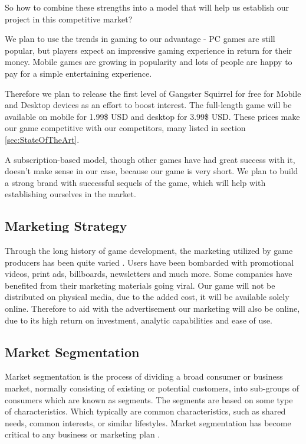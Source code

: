 \documentclass[12p]{article}
\begin{document}
So how to combine these strengths into a model that will help us establish our project in this competitive market?

We plan to use the trends in gaming to our advantage - PC games are still popular, but players expect an impressive gaming experience in return for their money. Mobile games are growing in popularity and lots of people are happy to pay for a simple entertaining experience.

Therefore we plan to release the first level of Gangster Squirrel for free for Mobile and Desktop devices as an effort to boost interest. The full-length game will be available on mobile for 1.99\$ USD and desktop for 3.99\$ USD. These prices make our game competitive with our competitors, many listed in section \ref{sec:StateOfTheArt}.

A subscription-based model, though other games have had great success with it, doesn’t make sense in our case, because our game is very short. We plan to build a strong brand with successful sequels of the game, which will help with establishing ourselves in the market.

\subsection{Marketing Strategy}

Through the long history of game development, the marketing utilized by game producers has been quite varied \cite{MarketingStrategyExamples}. Users have been bombarded with promotional videos, print ads, billboards, newsletters and much more. Some companies have benefited from their marketing materials going viral.
Our game will not be distributed on physical media, due to the added cost, it will be available solely online. Therefore to aid with the advertisement our marketing will also be online, due to its high return on investment, analytic capabilities and ease of use.


\subsection{Market Segmentation}

Market segmentation is the process of dividing a broad consumer or business market, normally consisting of existing or potential customers, into sub-groups of consumers which are known as segments. The segments are based on some type of characteristics. Which typically are common characteristics, such as shared needs, common interests, or similar lifestyles. Market segmentation has become critical to any business or marketing plan \cite{MarketSegmentation}.
\end{document}
